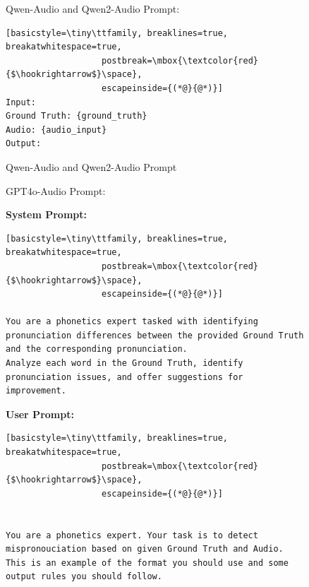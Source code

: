 \documentclass[11pt]{article}
\begin{document}
\begin{figure}[ht]
\begin{AIBox}{Qwen-Audio and Qwen2-Audio Prompt:}
\begin{minipage}[t]{\textwidth}
\begin{lstlisting}[basicstyle=\tiny\ttfamily, breaklines=true, breakatwhitespace=true,
                   postbreak=\mbox{\textcolor{red}{$\hookrightarrow$}\space},
                   escapeinside={(*@}{@*)}]
Input:
Ground Truth: {ground_truth}
Audio: {audio_input}
Output:

\end{lstlisting}
\end{minipage}

\end{AIBox}

\caption{Qwen-Audio and Qwen2-Audio Prompt}
\label{fig:qwen_qwen2_prompt}
\end{figure}



\begin{figure}[ht]
\begin{AIBox}{GPT4o-Audio Prompt:}

\begin{minipage}[t]{\textwidth}
{\bf System Prompt:} \scriptsize
\begin{lstlisting}[basicstyle=\tiny\ttfamily, breaklines=true, breakatwhitespace=true,
                   postbreak=\mbox{\textcolor{red}{$\hookrightarrow$}\space},
                   escapeinside={(*@}{@*)}]

You are a phonetics expert tasked with identifying pronunciation differences between the provided Ground Truth and the corresponding pronunciation. 
Analyze each word in the Ground Truth, identify pronunciation issues, and offer suggestions for improvement. 
\end{lstlisting}

\end{minipage}

\tcbline


\begin{minipage}[t]{\textwidth}
{\bf User Prompt:} \scriptsize
\begin{lstlisting}[basicstyle=\tiny\ttfamily, breaklines=true, breakatwhitespace=true,
                   postbreak=\mbox{\textcolor{red}{$\hookrightarrow$}\space},
                   escapeinside={(*@}{@*)}]


You are a phonetics expert. Your task is to detect mispronouciation based on given Ground Truth and Audio.
This is an example of the format you should use and some output rules you should follow.
        

\end{lstlisting}
\end{minipage}
\end{AIBox}
\end{figure}
\end{document}
